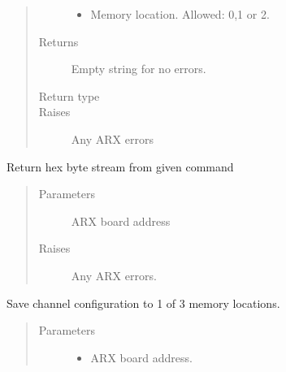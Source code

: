 \documentclass[letterpaper,10pt,english]{sphinxmanual}
\begin{document}
\begin{fulllineitems}
\begin{fulllineitems}
\begin{quote}
\begin{description}
\begin{itemize}
\item {} 
 \textendash{} Memory location. Allowed: 0,1 or 2.

\end{itemize}

\item[{Returns}] \leavevmode
Empty string for no errors.

\item[{Return type}] \leavevmode
{}

\item[{Raises}] \leavevmode
{} \textendash{} Any ARX errors

\end{description}\end{quote}

\end{fulllineitems}


\begin{fulllineitems}
\label{\detokenize{index:lwautils.lwa_arx.ARX.raw}}
Return hex byte stream from given command
\begin{quote}\begin{description}
\item[{Parameters}] \leavevmode
{} \textendash{} ARX board address

\item[{Raises}] \leavevmode
{} \textendash{} Any ARX errors.

\end{description}\end{quote}

\end{fulllineitems}


\begin{fulllineitems}
\label{\detokenize{index:lwautils.lwa_arx.ARX.save_cfg}}
Save channel configuration to 1 of 3 memory locations.
\begin{quote}\begin{description}
\item[{Parameters}] \leavevmode\begin{itemize}
\item {} 
 \textendash{} ARX board address.


\end{itemize}
\end{description}
\end{quote}
\end{fulllineitems}
\end{fulllineitems}
\end{document}
